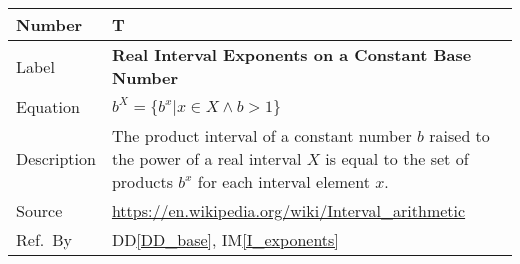 \documentclass[12pt]{article}
\newcommand{\colAwidth}{0.13\textwidth}
\newcommand{\colBwidth}{0.82\textwidth}
\newcommand{\ddref}[1]{DD\ref{#1}}
\newcounter{theorynum} %
\newcommand{\iref}[1]{IM\ref{#1}}
\begin{document}
\noindent
\begin{minipage}{\textwidth}
	\renewcommand*{\arraystretch}{1.5}
	\begin{tabular}{| p{\colAwidth} | p{\colBwidth}|}
		\hline
		\rowcolor[gray]{0.9}
		Number& T{theorynum}\thetheorynum 
		\label{T_exponents}\\
		\hline
		Label&\bf Real Interval Exponents on a Constant Base Number\\
		\hline
		Equation&  $b^X = \{b^x | x \in X \wedge b > 1\}$\\
		\hline
		Description & The product interval of a constant number $b$ raised to 
		the power of a real interval $X$ is equal to the set of products $b^x$ 
		for 
		each interval element $x$.\\
		\hline
		Source & \url{https://en.wikipedia.org/wiki/Interval_arithmetic}\\
		\hline
		Ref.\ By & \ddref{DD_base}, \iref{I_exponents}\\
		\hline
	\end{tabular}
\end{minipage}\\

~\newline
\end{document}
